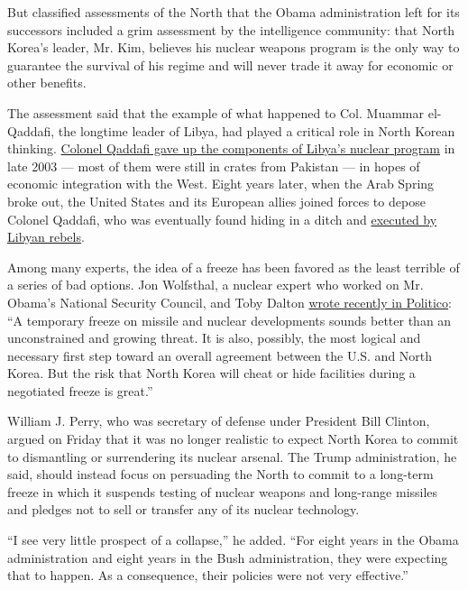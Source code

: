 But classified assessments of the North that the Obama administration
left for its successors included a grim assessment by the intelligence
community: that North Korea's leader, Mr. Kim, believes his nuclear
weapons program is the only way to guarantee the survival of his regime
and will never trade it away for economic or other benefits.

The assessment said that the example of what happened to Col. Muammar
el-Qaddafi, the longtime leader of Libya, had played a critical role in
North Korean thinking.
\href{http://www.nytimes3xbfgragh.onion/2003/12/20/world/libya-to-give-up-arms-programs-bush-announces.html}{Colonel
Qaddafi gave up the components of Libya's nuclear program} in late 2003
--- most of them were still in crates from Pakistan --- in hopes of
economic integration with the West. Eight years later, when the Arab
Spring broke out, the United States and its European allies joined
forces to depose Colonel Qaddafi, who was eventually found hiding in a
ditch and
\href{http://www.nytimes3xbfgragh.onion/2011/10/21/world/africa/qaddafi-killed-as-hometown-falls-to-libyan-rebels.html}{executed
by Libyan rebels}.

Among many experts, the idea of a freeze has been favored as the least
terrible of a series of bad options. Jon Wolfsthal, a nuclear expert who
worked on Mr. Obama's National Security Council, and Toby Dalton
\href{http://www.politico.com/magazine/story/2017/03/can-trump-stop-kim-jong-un-214910}{wrote
recently in Politico}: ``A temporary freeze on missile and nuclear
developments sounds better than an unconstrained and growing threat. It
is also, possibly, the most logical and necessary first step toward an
overall agreement between the U.S. and North Korea. But the risk that
North Korea will cheat or hide facilities during a negotiated freeze is
great.''

William J. Perry, who was secretary of defense under President Bill
Clinton, argued on Friday that it was no longer realistic to expect
North Korea to commit to dismantling or surrendering its nuclear
arsenal. The Trump administration, he said, should instead focus on
persuading the North to commit to a long-term freeze in which it
suspends testing of nuclear weapons and long-range missiles and pledges
not to sell or transfer any of its nuclear technology.

``I see very little prospect of a collapse,'' he added. ``For eight
years in the Obama administration and eight years in the Bush
administration, they were expecting that to happen. As a consequence,
their policies were not very effective.''


